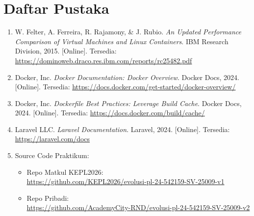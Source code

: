 \chapter{Daftar Pustaka}

\begin{enumerate}
    \item \label{felter} W. Felter, A. Ferreira, R. Rajamony, \& J. Rubio. \textit{An Updated Performance Comparison of Virtual Machines and Linux Containers}. IBM Research Division, 2015. [Online]. Tersedia: \url{https://dominoweb.draco.res.ibm.com/reports/rc25482.pdf}

    \item \label{dockerdocs} Docker, Inc. \textit{Docker Documentation: Docker Overview}. Docker Docs, 2024. [Online]. Tersedia: \url{https://docs.docker.com/get-started/docker-overview/}

    \item \label{dockerbp} Docker, Inc. \textit{Dockerfile Best Practices: Leverage Build Cache}. Docker Docs, 2024. [Online]. Tersedia: \url{https://docs.docker.com/build/cache/}

    \item \label{laravel} Laravel LLC. \textit{Laravel Documentation}. Laravel, 2024. [Online]. Tersedia: \url{https://laravel.com/docs}

    \item \label{sourcecode} Source Code Praktikum:
    \begin{itemize}
        \item Repo Matkul KEPL2026:\\
        \url{https://github.com/KEPL2026/evolusi-pl-24-542159-SV-25009-v1}

        \item Repo Pribadi:\\
        \url{https://github.com/AcademyCity-RND/evolusi-pl-24-542159-SV-25009-v2}
    \end{itemize}
\end{enumerate}